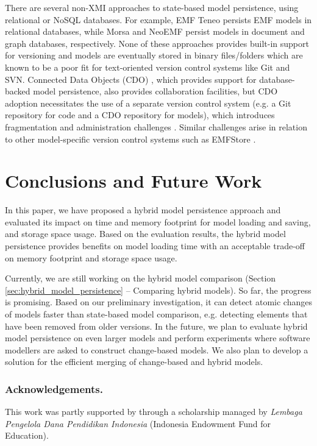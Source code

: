 \documentclass{llncs}
\begin{document}
\vspace{-10pt}
There are several non-XMI approaches to state-based model persistence, using relational or NoSQL databases. For example, EMF Teneo \cite{eclipse2017teneo} persists EMF models in relational databases, while Morsa \cite{DBLP:conf/models/Espinazo-PaganCM11} and NeoEMF \cite{daniel2016neoemf} persist models in document and graph databases, respectively. None of these approaches provides built-in support for versioning and models are eventually stored in binary files/folders which are known to be a poor fit for text-oriented version control systems like Git and SVN. Connected Data Objects (CDO) \cite{eclipse2017cdo}, which provides support for database-backed model persistence, also provides collaboration facilities, but CDO adoption necessitates the use of a separate version control system (e.g. a Git repository for code and a CDO repository for models), which introduces fragmentation and administration challenges \cite{barmpis2014evaluation}. Similar challenges arise in relation to other model-specific version control systems such as EMFStore \cite{koegel2010emfstore}. %

\vspace{-10pt}
\section{Conclusions and Future Work}
\label{sec:conlcusions_and_future_work}

\vspace{-10pt}
In this paper, we have proposed a hybrid model persistence approach and evaluated its impact on time and memory footprint for model loading and saving, and storage space usage.
Based on the evaluation results, the hybrid model persistence provides benefits on model loading time 
with an acceptable trade-off on memory footprint and storage space usage. 

Currently, we are still working on the hybrid model comparison (Section \ref{sec:hybrid_model_persistence} -- Comparing hybrid models). So far, the progress is promising. Based on our preliminary investigation, it can detect atomic changes of models faster than state-based model comparison, e.g. detecting elements that have been removed from older versions. In the future, we plan to evaluate hybrid model persistence on even larger models and perform experiments where software modellers are asked to construct change-based models. We also plan to develop a solution for the efficient merging of change-based and hybrid models. 

\vspace{-10pt}
\subsubsection*{Acknowledgements.} This work was partly supported by through a scholarship managed by \emph{Lembaga Pengelola Dana Pendidikan Indonesia} (Indonesia Endowment Fund for Education).

 

\end{document}
